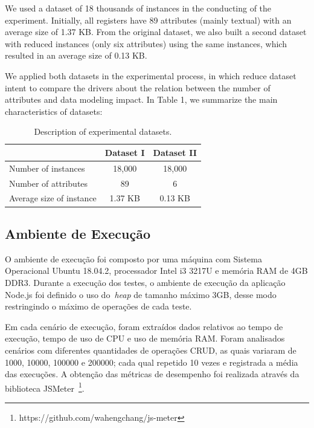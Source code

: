 \documentclass{svproc}
\begin{document}
We used a dataset of 18 thousands of instances in the conducting of the experiment. Initially, all registers have 89 attributes (mainly textual) with an average size of 1.37 KB.
From the original dataset, we also built a second dataset with reduced instances (only six attributes) using the same instances, which resulted in an average size of 0.13 KB.

We applied both datasets in the experimental process, in which reduce dataset intent to compare the drivers about the relation between the number of attributes and data modeling impact.
In Table 1, we summarize the main characteristics of datasets:

\begin{table}[ht]
\centering
\caption{Description of experimental datasets.}
\label{tab:conjunto-dados}
\begin{tabular}{c|c|c|}
\cline{2-3}
                         & \textbf{Dataset I} & \textbf{Dataset II} \\ \hline
\multicolumn{1}{|l|}{Number of instances} & 18,000 		 			& 18,000            \\ \hline
\multicolumn{1}{|l|}{Number of attributes}  & 89        		 			& 6                  \\ \hline
\multicolumn{1}{|l|}{Average size of instance}   & 1.37 KB        				& 0.13 KB                    \\ \hline
\end{tabular}
\end{table}

\subsection{Ambiente de Execução}

O ambiente de execução foi composto por uma máquina com Sistema Operacional Ubuntu 18.04.2, processador Intel i3 3217U e memória RAM de 4GB DDR3. 
Durante a execução dos testes, o ambiente de execução da aplicação Node.js foi definido o uso do~\emph{heap} de tamanho máximo 3GB, desse modo restringindo o máximo de operações de cada teste.

Em cada cenário de execução, foram extraídos dados relativos ao tempo de execução, tempo de uso de CPU e uso de memória RAM. 
Foram analisados cenários com diferentes quantidades de operações CRUD, as quais variaram de 1000, 10000, 100000 e 200000; cada qual repetido 10 vezes e registrada a média das execuções. A obtenção das métricas de desempenho foi realizada através da biblioteca JSMeter~\footnote{https://github.com/wahengchang/js-meter}. 
\end{document}

